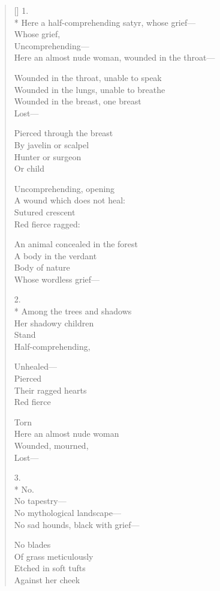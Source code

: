 \begin{verse}[\versewidth]
1.\\*
Here a half-comprehending satyr, whose grief---\\
Whose grief,\\
Uncomprehending---\\
Here an almost nude woman, wounded in the throat---

Wounded in the throat, unable to speak\\
Wounded in the lungs, unable to breathe\\
Wounded in the breast, one breast\\
Lost---

Pierced through the breast\\
By javelin or scalpel\\
Hunter or surgeon\\
Or child

Uncomprehending, opening\\
A wound which does not heal:\\
Sutured crescent\\
Red \quad fierce \quad ragged:

An animal concealed in the forest\\
A body in the verdant\\
Body of nature\\
Whose wordless grief---

2.\\*
Among the trees and shadows\\
Her shadowy children\\
Stand\\
Half-comprehending,

Unhealed---\\
Pierced\\
Their ragged hearts\\
Red \quad fierce

Torn\\
Here an almost nude woman\\
Wounded, mourned, \\
Lost---

3.\\*
No.\\
No tapestry---\\
No mythological landscape---\\
No sad hounds, black with grief---

No blades\\
Of grass meticulously\\
Etched in soft tufts \\
Against her cheek


\end{verse}
